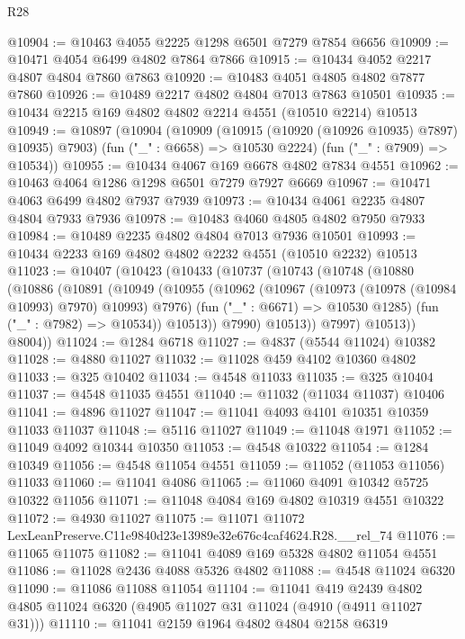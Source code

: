 \begin{lexlean}{R28}
\begin{coremodule}
@10904 := @10463 @4055 @2225 @1298 @6501 @7279 @7854 @6656
@10909 := @10471 @4054 @6499 @4802 @7864 @7866
@10915 := @10434 @4052 @2217 @4807 @4804 @7860 @7863
@10920 := @10483 @4051 @4805 @4802 @7877 @7860
@10926 := @10489 @2217 @4802 @4804 @7013 @7863 @10501
@10935 := @10434 @2215 @169 @4802 @4802 @2214 @4551 (@10510 @2214) @10513
@10949 := @10897
    (@10904
      (@10909 (@10915 (@10920 (@10926 @10935) @7897) @10935) @7903)
      (fun ("_" : @6658) => @10530 @2224)
      (fun ("_" : @7909) => @10534))
@10955 := @10434 @4067 @169 @6678 @4802 @7834 @4551
@10962 := @10463 @4064 @1286 @1298 @6501 @7279 @7927 @6669
@10967 := @10471 @4063 @6499 @4802 @7937 @7939
@10973 := @10434 @4061 @2235 @4807 @4804 @7933 @7936
@10978 := @10483 @4060 @4805 @4802 @7950 @7933
@10984 := @10489 @2235 @4802 @4804 @7013 @7936 @10501
@10993 := @10434 @2233 @169 @4802 @4802 @2232 @4551 (@10510 @2232) @10513
@11023 := @10407
    (@10423
      (@10433
        (@10737
          (@10743
            (@10748
              (@10880
                (@10886
                  (@10891
                    (@10949
                      (@10955
                        (@10962
                          (@10967 (@10973 (@10978 (@10984 @10993) @7970) @10993) @7976)
                          (fun ("_" : @6671) => @10530 @1285)
                          (fun ("_" : @7982) => @10534))
                        @10513))
                    @7990)
                  @10513))
              @7997)
            @10513))
        @8004))
@11024 := @1284 @6718
@11027 := @4837 (@5544 @11024) @10382
@11028 := @4880 @11027
@11032 := @11028 @459 @4102 @10360 @4802
@11033 := @325 @10402
@11034 := @4548 @11033
@11035 := @325 @10404
@11037 := @4548 @11035 @4551
@11040 := @11032 (@11034 @11037) @10406
@11041 := @4896 @11027
@11047 := @11041 @4093 @4101 @10351 @10359 @11033 @11037
@11048 := @5116 @11027
@11049 := @11048 @1971
@11052 := @11049 @4092 @10344 @10350
@11053 := @4548 @10322
@11054 := @1284 @10349
@11056 := @4548 @11054 @4551
@11059 := @11052 (@11053 @11056) @11033
@11060 := @11041 @4086
@11065 := @11060 @4091 @10342 @5725 @10322 @11056
@11071 := @11048 @4084 @169 @4802 @10319 @4551 @10322
@11072 := @4930 @11027
@11075 := @11071 @11072 LexLeanPreserve.C11e9840d23e13989e32e676c4caf4624.R28.__rel_74
@11076 := @11065 @11075
@11082 := @11041 @4089 @169 @5328 @4802 @11054 @4551
@11086 := @11028 @2436 @4088 @5326 @4802
@11088 := @4548 @11024 @6320
@11090 := @11086 @11088 @11054
@11104 := @11041
    @419
    @2439
    @4802
    @4805
    @11024
    @6320
    (@4905 @11027 @31 @11024 (@4910 (@4911 @11027 @31)))
@11110 := @11041 @2159 @1964 @4802 @4804 @2158 @6319

\end{coremodule}
\end{lexlean}

